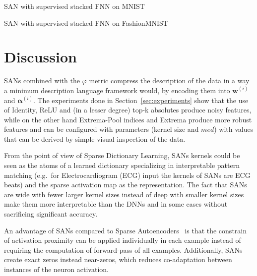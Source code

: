 \documentclass[journal]{IEEEtran}
\begin{document}
\begin{table*}[!t]
	\centering
	\caption{SAN with supervised stacked FNN on MNIST}\label{table:mnistsupervised}
	\begin{adjustbox}{width=\textwidth}
		
	\end{adjustbox}
\end{table*}

\begin{table*}[!t]
	\centering
	\caption{SAN with supervised stacked FNN on FashionMNIST}\label{table:fashionmnistsupervised}
	\begin{adjustbox}{width=\textwidth}
		
	\end{adjustbox}
\end{table*}

\section{Discussion}\label{sec:discussion}
SANs combined with the $\varphi$ metric compress the description of the data in a way a minimum description language framework would, by encoding them into $\bm{w}^{(i)}$ and $\bm{\alpha}^{(i)}$.
The experiments done in Section~\ref{sec:experiments} show that the use of Identity, ReLU and (in a lesser degree) top-k absolutes produce noisy features, while on the other hand Extrema-Pool indices and Extrema produce more robust features and can be configured with parameters (kernel size and $med$) with values that can be derived by simple visual inspection of the data.

From the point of view of Sparse Dictionary Learning, SANs kernels could be seen as the atoms of a learned dictionary specializing in interpretable pattern matching (e.g.\ for Electrocardiogram (ECG) input the kernels of SANs are ECG beats) and the sparse activation map as the representation.
The fact that SANs are wide with fewer larger kernel sizes instead of deep with smaller kernel sizes make them more interpretable than the DNNs and in some cases without sacrificing significant accuracy.

An advantage of SANs compared to Sparse Autoencoders~\cite{ng2011sparse} is that the constrain of activation proximity can be applied individually in each example instead of requiring the computation of forward-pass of all examples.
Additionally, SANs create exact zeros instead near-zeros, which reduces co-adaptation between instances of the neuron activation.
\end{document}
